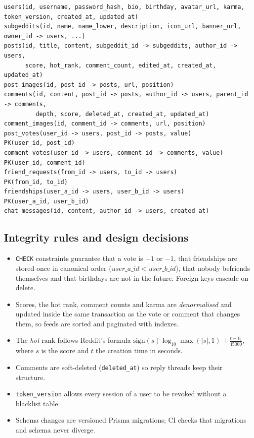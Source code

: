 \documentclass[11pt,a4paper]{article}
\begin{document}
\begin{lstlisting}
users(id, username, password_hash, bio, birthday, avatar_url, karma, token_version, created_at, updated_at)
subgeddits(id, name, name_lower, description, icon_url, banner_url, owner_id -> users, ...)
posts(id, title, content, subgeddit_id -> subgeddits, author_id -> users,
      score, hot_rank, comment_count, edited_at, created_at, updated_at)
post_images(id, post_id -> posts, url, position)
comments(id, content, post_id -> posts, author_id -> users, parent_id -> comments,
         depth, score, deleted_at, created_at, updated_at)
comment_images(id, comment_id -> comments, url, position)
post_votes(user_id -> users, post_id -> posts, value)          PK(user_id, post_id)
comment_votes(user_id -> users, comment_id -> comments, value) PK(user_id, comment_id)
friend_requests(from_id -> users, to_id -> users)              PK(from_id, to_id)
friendships(user_a_id -> users, user_b_id -> users)            PK(user_a_id, user_b_id)
chat_messages(id, content, author_id -> users, created_at)
\end{lstlisting}

\subsection{Integrity rules and design decisions}

\begin{itemize}
  \item \texttt{CHECK} constraints guarantee that a vote is $+1$ or $-1$, that friendships are stored once in
        canonical order ($user\_a\_id < user\_b\_id$), that nobody befriends themselves and that birthdays are not
        in the future. Foreign keys cascade on delete.
  \item Scores, the hot rank, comment counts and karma are \emph{denormalised} and updated inside the same
        transaction as the vote or comment that changes them, so feeds are sorted and paginated with indexes.
  \item The \emph{hot} rank follows Reddit's formula
        $\mathrm{sign}(s)\log_{10}\max(|s|,1) + \frac{t - t_0}{45000}$, where $s$ is the score and $t$ the
        creation time in seconds.
  \item Comments are soft-deleted (\texttt{deleted\_at}) so reply threads keep their structure.
  \item \texttt{token\_version} allows every session of a user to be revoked without a blacklist table.
  \item Schema changes are versioned Prisma migrations; CI checks that migrations and schema never diverge.
\end{itemize}
\end{document}

